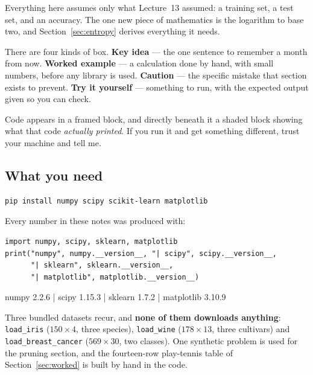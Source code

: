 \documentclass[11pt]{article}
\begin{document}
Everything here assumes only what Lecture~13 assumed: a training set, a
test set, and an accuracy. The one new piece of mathematics is the logarithm
to base two, and Section~\ref{sec:entropy} derives everything it needs.

There are four kinds of box. \textbf{Key idea} --- the one sentence to
remember a month from now. \textbf{Worked example} --- a calculation done by
hand, with small numbers, before any library is used. \textbf{Caution} --- the
specific mistake that section exists to prevent. \textbf{Try it yourself} ---
something to run, with the expected output given so you can check.

Code appears in a framed block, and directly beneath it a shaded block showing
what that code \emph{actually printed}. If you run it and get something
different, trust your machine and tell me.

\subsection{What you need}

\begin{lstlisting}
pip install numpy scipy scikit-learn matplotlib
\end{lstlisting}

Every number in these notes was produced with:

\begin{lstlisting}
import numpy, scipy, sklearn, matplotlib
print("numpy", numpy.__version__, "| scipy", scipy.__version__,
      "| sklearn", sklearn.__version__,
      "| matplotlib", matplotlib.__version__)
\end{lstlisting}
\begin{codeout}
numpy 2.2.6 | scipy 1.15.3 | sklearn 1.7.2 | matplotlib 3.10.9
\end{codeout}

Three bundled datasets recur, and \textbf{none of them downloads anything}:
\texttt{load\_iris} ($150 \times 4$, three species),
\texttt{load\_wine} ($178 \times 13$, three cultivars) and
\texttt{load\_breast\_cancer} ($569 \times 30$, two classes). One synthetic
problem is used for the pruning section, and the fourteen-row play-tennis
table of Section~\ref{sec:worked} is built by hand in the code.
\end{document}
